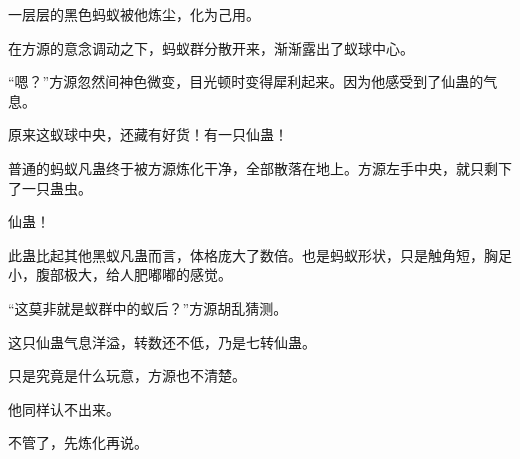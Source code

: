 \begin{this_body}
一层层的黑色蚂蚁被他炼尘，化为己用。

在方源的意念调动之下，蚂蚁群分散开来，渐渐露出了蚁球中心。

“嗯？”方源忽然间神色微变，目光顿时变得犀利起来。因为他感受到了仙蛊的气息。

原来这蚁球中央，还藏有好货！有一只仙蛊！

普通的蚂蚁凡蛊终于被方源炼化干净，全部散落在地上。方源左手中央，就只剩下了一只蛊虫。

仙蛊！

此蛊比起其他黑蚁凡蛊而言，体格庞大了数倍。也是蚂蚁形状，只是触角短，胸足小，腹部极大，给人肥嘟嘟的感觉。

“这莫非就是蚁群中的蚁后？”方源胡乱猜测。

这只仙蛊气息洋溢，转数还不低，乃是七转仙蛊。

只是究竟是什么玩意，方源也不清楚。

他同样认不出来。

不管了，先炼化再说。

\end{this_body}

